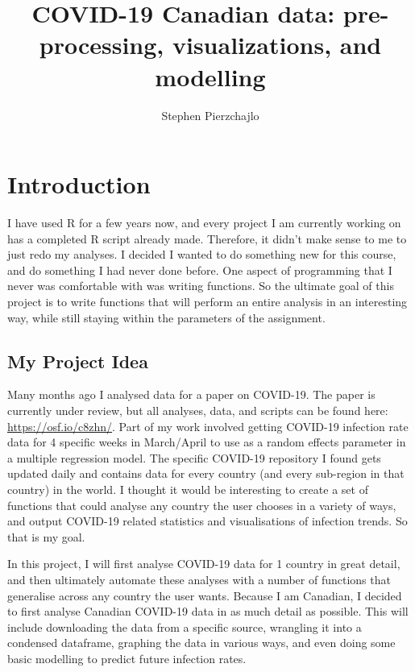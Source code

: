 \documentclass[]{tufte-handout}
\title{COVID-19 Canadian data: pre-processing, visualizations, and modelling}
\author{Stephen Pierzchajlo}
\date{}
\begin{document}
\maketitle




\hypertarget{introduction}{%
\section{Introduction}\label{introduction}}

I have used R for a few years now, and every project I am currently
working on has a completed R script already made. Therefore, it didn't
make sense to me to just redo my analyses. I decided I wanted to do
something new for this course, and do something I had never done before.
One aspect of programming that I never was comfortable with was writing
functions. So the ultimate goal of this project is to write functions
that will perform an entire analysis in an interesting way, while still
staying within the parameters of the assignment.

\hypertarget{my-project-idea}{%
\subsection{My Project Idea}\label{my-project-idea}}

Many months ago I analysed data for a paper on COVID-19. The paper is
currently under review, but all analyses, data, and scripts can be found
here: \url{https://osf.io/c8zhn/}. Part of my work involved getting
COVID-19 infection rate data for 4 specific weeks in March/April to use
as a random effects parameter in a multiple regression model. The
specific COVID-19 repository I found gets updated daily and contains
data for every country (and every sub-region in that country) in the
world. I thought it would be interesting to create a set of functions
that could analyse any country the user chooses in a variety of ways,
and output COVID-19 related statistics and visualisations of infection
trends. So that is my goal.

In this project, I will first analyse COVID-19 data for 1 country in
great detail, and then ultimately automate these analyses with a number
of functions that generalise across any country the user wants. Because
I am Canadian, I decided to first analyse Canadian COVID-19 data in as
much detail as possible. This will include downloading the data from a
specific source, wrangling it into a condensed dataframe, graphing the
data in various ways, and even doing some basic modelling to predict
future infection rates.
\end{document}
